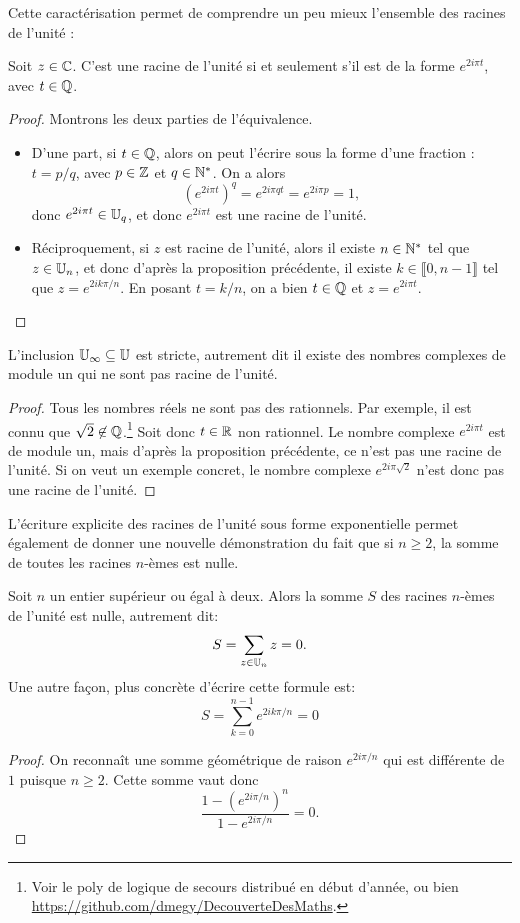 Cette caractérisation permet de comprendre un peu mieux l'ensemble des racines de l'unité :
\begin{proposition}
Soit $z\in \mathbb{C}$. C'est une racine de l'unité si et seulement s'il est de la forme $e^{2i\pi t}$, avec $t\in \mathbb{Q}$.
\end{proposition}
\begin{proof}
Montrons les deux parties de l'équivalence.
\begin{itemize}
\item D'une part, si $t\in \mathbb{Q}$, alors on peut l'écrire sous la forme d'une fraction : $t=p/q$, avec $p\in \mathbb{Z}$ et $q\in \mathbb{N}^*$. On a alors 
\[ \left(e^{2i\pi t}\right)^q=e^{2i\pi qt} = e^{2i\pi p}=1,\]
donc $e^{2i\pi t} \in \mathbb{U}_q$, et donc $e^{2i\pi t}$ est une racine de l'unité.
\item Réciproquement, si $z$ est racine de l'unité, alors  il existe $n\in \mathbb{N}^*$ tel que $z\in \mathbb{U}_n$, et donc d'après la proposition précédente, il existe $k\in \llbracket 0,n-1\rrbracket$ tel que $z=e^{2ik\pi/n}$. En posant $t=k/n$, on a bien $t\in \mathbb{Q}$ et $z=e^{2i\pi t}$.
\end{itemize}
\end{proof}

\begin{corollaire}
L'inclusion $\mathbb{U}_\infty \subseteq \mathbb{U}$ est stricte, autrement dit il existe des nombres complexes de module un qui ne sont pas racine de l'unité.
\end{corollaire}
\begin{proof}
Tous les nombres réels ne sont pas des rationnels. Par exemple, il est connu que $\sqrt 2 \not\in \mathbb{Q}$.\footnote{Voir le \og poly de logique de secours\fg{} distribué en début d'année, ou bien \url{https://github.com/dmegy/DecouverteDesMaths}.}
Soit donc $t\in \mathbb{R}$ non rationnel. Le nombre complexe $e^{2i\pi t}$ est de module un, mais d'après la proposition précédente, ce n'est pas une racine de l'unité.
Si on veut un exemple concret, le nombre complexe $e^{2i\pi\sqrt 2}$ n'est donc pas une racine de l'unité.
\end{proof}


L'écriture explicite des racines de l'unité sous forme exponentielle permet également de donner une nouvelle démonstration du fait que si $n\geq 2$, la somme de toutes les racines $n$-èmes est nulle.

\begin{proposition}
Soit $n$ un entier supérieur ou égal à deux. Alors la somme $S$ des racines $n$-èmes de l'unité est nulle, autrement dit:
\[ S=\sum_{z\in \mathbb{U}_n}z = 0.\]
Une autre façon, plus concrète d'écrire cette formule est:
\[ S=\sum_{k=0}^{n-1}e^{2ik\pi/n} = 0\]
\end{proposition}
\begin{proof}
On reconnaît une somme géométrique de raison $e^{2i\pi/n}$ qui est différente de $1$ puisque $n\geq 2$. Cette somme vaut donc
\[ \frac{1-\left(e^{2i\pi/n}\right)^n}{1-e^{2i\pi/n}} = 0.\]
\end{proof}

